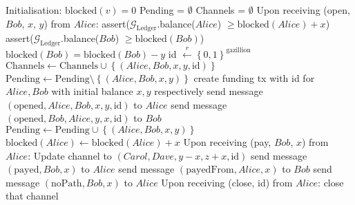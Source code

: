 \begin{algorithm}
  \caption{$\mathcal{F}_{\mathrm{PayNet}}$}
  \label{alg:payfunc}
  \begin{algorithmic}[1]
    \State Initialisation:
      \State $\mathrm{blocked}\left(v\right) = 0$
    \EndFor
    \State Pending = $\emptyset$
    \State Channels = $\emptyset$
    \State
    \State Upon receiving (open, $Bob$, $x$, $y$) from $Alice$:
        \State assert($\mathcal{G}_{\mathrm{Ledger}}$.balance($Alice$) $\geq
        \mathrm{blocked}\left(Alice\right) + x$)
        \State assert($\mathcal{G}_{\mathrm{Ledger}}$.balance($Bob$) $\geq
        \mathrm{blocked}\left(Bob\right)$)
        \State $\mathrm{blocked}\left(Bob\right) = \mathrm{blocked}\left(Bob\right) - y$
        \State id $\overset{r}{\leftarrow} \left\{0, 1\right\}^{\mathrm{gazillion}}$
        \State $\mathrm{Channels} \leftarrow \mathrm{Channels} \cup \left\{\left(Alice,
        Bob, x, y, \mathrm{id}\right)\right\}$
        \State $\mathrm{Pending} \leftarrow \mathrm{Pending} \setminus \left\{\left(Alice,
        Bob, x, y\right)\right\}$
        \State create funding tx with id for $Alice, Bob$ with initial balance $x, y$
        respectively
        \State send message $\left(\mathrm{opened}, Alice, Bob, x, y, \mathrm{id}\right)$
        to $Alice$
        \State send message $\left(\mathrm{opened}, Bob, Alice, y, x, \mathrm{id}\right)$
        to $Bob$
      \Else
        \State $\mathrm{Pending} \leftarrow \mathrm{Pending} \cup \left\{\left(Alice, Bob,
        x, y\right)\right\}$
        \State $\mathrm{blocked}\left(Alice\right) \leftarrow
        \mathrm{blocked}\left(Alice\right) + x$
      \EndIf
    \State
    \State Upon receiving (pay, $Bob$, $x$) from $Alice$:
          \State Update channel to $\left(Carol, Dave, y - x, z + x, \mathrm{id}\right)$
        \EndFor
        \State send message $\left(\mathrm{payed}, Bob, x\right)$ to $Alice$
        \State send message $\left(\mathrm{payedFrom}, Alice, x\right)$ to $Bob$
      \Else
        \State send message $\left(\mathrm{noPath}, Bob, x\right)$ to $Alice$
      \EndIf
    \State
    \State Upon receiving (close, id) from $Alice$:
        \State close that channel
      \EndIf
  \end{algorithmic}
\end{algorithm}
